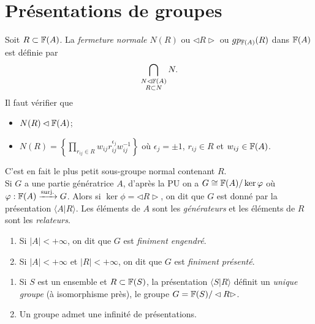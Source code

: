
\chapter{Présentations de groupes}

  Soit $R \subset \mathbb{F}(A)$. La \emph{fermeture normale $N(R)$} ou $\lhd R \rhd$ ou $gp_{\mathbb{F}(A)}(R)$ dans $\mathbb{F}(A)$ est
  définie par
    \[\bigcap_{\substack{N \lhd \mathbb{F}(A) \\ R \subset N}}N.\]
  Il faut vérifier que 
  \begin{itemize}
  \item $N(R) \lhd \mathbb{F}(A)$;
    
  \item $N(R) = \left\{ \prod_{r_{ij} \in R}w_{ij} r_{ij}^{\epsilon_j}w_{ij}^{-1} \right\}$ où $\epsilon_j =
    \pm 1$, $r_{ij} \in R$ et $w_{ij} \in \mathbb{F}(A)$.
  \end{itemize}
  C'est en fait le plus petit sous-groupe normal contenant $R$.\\

  Si $G$ a une partie génératrice $A$, d'après la PU on a $G \cong \mathbb{F}(A)/\ker \varphi$ où $\varphi: \mathbb{F}(A)
  \xrightarrow{\mathrm{surj.}} G$. Alors si $\ker \phi = \lhd R \rhd$, on dit que $G$ est donné par la
  présentation $\langle A | R \rangle$. Les éléments de $A$ sont les \emph{générateurs} et les éléments de $R$
  sont les \emph{relateurs}.

  \begin{rems}
    \begin{enumerate}
    \item Si $|A|<+\infty$, on dit que $G$ est \emph{finiment engendré}.
    \item Si $|A|<+\infty$ et $|R|<+\infty$, on dit que $G$ est \emph{finiment présenté}.
    \end{enumerate}
  \end{rems}

  \begin{rems}
    \begin{enumerate}
    \item Si $S$ est un ensemble et $R \subset \mathbb{F}(S)$, la présentation $\langle S | R \rangle$ définit un
      \emph{unique groupe} (à isomorphisme près), le groupe $G = \mathbb{F}(S)/\lhd R \rhd$.

    \item Un groupe admet une infinité de présentations.
    \end{enumerate}
  \end{rems}

